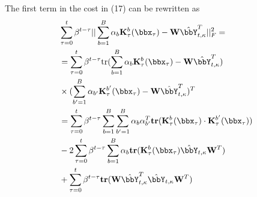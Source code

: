 \documentclass[10pt,final]{IEEEtran}
\begin{document}
The first term in the cost in (17) can be rewritten as 
\begin{align}\label{eq:Cost_first_term_details}
&\sum_{\tau=0}^{t}\beta^{t-\tau}||\sum_{b=1}^{B}\mathbf{\alpha}_b\mathbf{K}_{\tau}^b(\bbx_{\tau})-\mathbf{W}\hat{\bbY}_{t,\kappa}^T||_F^2=\\
&=\sum_{\tau=0}^{t}\beta^{t-\tau}\textrm{tr}(\sum_{b=1}^{B}\mathbf{\alpha}_{b}\mathbf{K}_{\tau}^{b}(\bbx_{\tau})-\mathbf{W}\hat{\bbY}_{t,\kappa}^T)\nonumber\\
&\times(\sum_{b'=1}^{B}\mathbf{\alpha}_{b'}\mathbf{K}_{\tau}^{b'}(\bbx_{\tau})-\mathbf{W}\hat{\bbY}_{t,\kappa}^T)^T\nonumber\\
&=\sum_{\tau=0}^{t}\beta^{t-\tau}\sum_{b=1}^{B}\sum_{b'=1}^{B}\mathbf{\alpha}_b\mathbf{\alpha}_{b'}^T\mathbf{tr}(\mathbf{K}_{\tau}^{b}(\bbx_{\tau})\cdot\mathbf{K}_{\tau}^{b'}(\bbx_{\tau}))\nonumber\\
&-2\sum_{\tau=0}^{t}\beta^{t-\tau}\sum_{b=1}^{B}\mathbf{\alpha}_b\mathbf{tr}(\mathbf{K}_{\tau}^{b}(\bbx_{\tau})\hat{\bbY}_{t,\kappa}\mathbf{W}^T)\nonumber\\
&+\sum_{\tau=0}^{t}\beta^{t-\tau}\mathbf{tr}(\mathbf{W}\hat{\bbY}_{t,\kappa}^T\hat{\bbY}_{t,\kappa}\mathbf{W}^T)\nonumber
\end{align}
\end{document}
